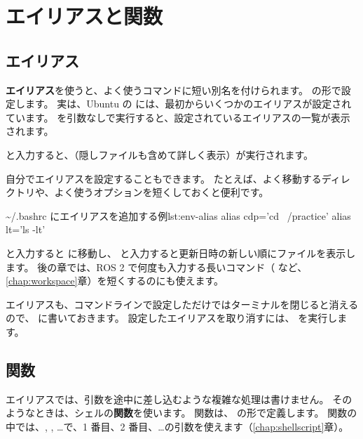 \section{エイリアスと関数}
\label{sec:env-alias}

\subsection{エイリアス}

\textbf{エイリアス}を使うと、よく使うコマンドに短い別名を付けられます。
 の形で設定します。
実は、Ubuntu の  には、最初からいくつかのエイリアスが設定されています。
 を引数なしで実行すると、設定されているエイリアスの一覧が表示されます。


 と入力すると、（隠しファイルも含めて詳しく表示）が実行されます。

自分でエイリアスを設定することもできます。
たとえば、よく移動するディレクトリや、よく使うオプションを短くしておくと便利です。

\begin{codelisting}[style=bash]{\textasciitilde/.bashrc にエイリアスを追加する例}{lst:env-alias}
alias cdp='cd ~/practice'
alias lt='ls -lt'
\end{codelisting}

 と入力すると  に移動し、 と入力すると更新日時の新しい順にファイルを表示します。
後の章では、ROS 2 で何度も入力する長いコマンド（ など、\ref{chap:workspace}章）を短くするのにも使えます。

エイリアスも、コマンドラインで設定しただけではターミナルを閉じると消えるので、 に書いておきます。
設定したエイリアスを取り消すには、 を実行します。

\subsection{関数}

エイリアスでは、引数を途中に差し込むような複雑な処理は書けません。
そのようなときは、シェルの\textbf{関数}を使います。
関数は、 の形で定義します。
関数の中では、, , \ldots で、1 番目、2 番目、\ldots の引数を使えます（\ref{chap:shellscript}章）。

